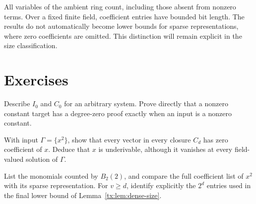 All variables of the ambient ring count, including those absent from
nonzero terms. Over a fixed finite field, coefficient entries have
bounded bit length. The results do not automatically become lower
bounds for sparse representations, where zero coefficients are omitted.
This distinction will remain explicit in the size classification.

\section{Exercises}
\begin{exercise}\label{tx:ex:closure-zero}
Describe $I_0$ and $C_0$ for an arbitrary system. Prove directly that a
nonzero constant target has a degree-zero proof exactly when an input
is a nonzero constant.
\end{exercise}
\par\medskip

\begin{exercise}\label{tx:ex:closure-witness}
With input $\Gamma=\{x^2\}$, show that every vector in every closure
$C_d$ has zero coefficient of $x$. Deduce that $x$ is underivable,
although it vanishes at every field-valued solution of $\Gamma$.
\end{exercise}
\par\medskip

\begin{exercise}\label{tx:ex:dense-count}
List the monomials counted by $B_2(2)$, and compare the full coefficient
list of $x^2$ with its sparse representation. For $v\ge d$, identify
explicitly the $2^d$ entries used in the final lower bound of
Lemma~\ref{tx:lem:dense-size}.
\end{exercise}
\par\medskip

